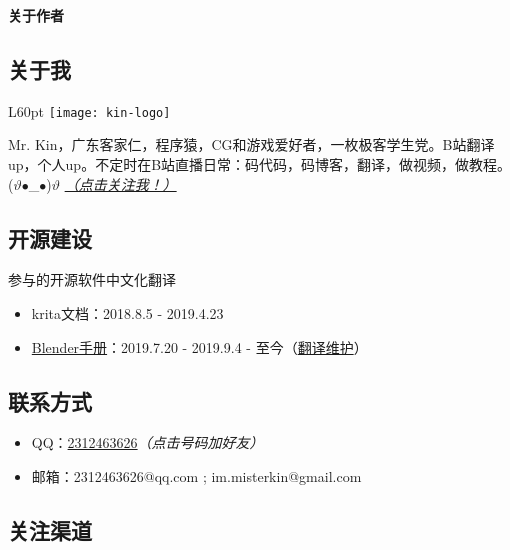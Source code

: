 \begin{center}
    {\bfseries\sffamily\Large 关于作者}
\end{center}

\subsection*{\bfseries \sffamily 关于我}
\begin{wrapfigure}[3]{L}{60pt}
    \vspace*{-20pt}
    \centering
    \texttt{[image: kin-logo]}
\end{wrapfigure}
Mr. Kin，广东客家仁，程序猿，CG和游戏爱好者，一枚极客学生党。B站翻译up，个人up。不定时在B站直播日常：码代码，码博客，翻译，做视频，做教程。 ($\vartheta$$\bullet$\_$\bullet$)$\vartheta$ \hyperlink{follow}{\emph{（点击关注我！）}}

\subsection*{\bfseries \sffamily 开源建设}

\noindent 参与的开源软件中文化翻译

\begin{itemize}
    \item krita文档：2018.8.5 - 2019.4.23
    \item \href{https://www.blendercn.org/5812.html?tdsourcetag=s_pctim_aiomsg}{Blender手册}：2019.7.20 - 2019.9.4 - 至今（\href{https://developer.blender.org/p/Mr_Kin/}{翻译维护}）
\end{itemize}

\subsection*{\bfseries \sffamily \hypertarget{contact}{联系方式}}
\vspace*{-1ex}

\begin{itemize}
    \item QQ：\href{tencent://AddContact/?fromId=45&fromSubId=1&subcmd=all&uin=2312463626&website=www.oicqzone.com}{2312463626}\emph{\color{red}（点击号码加好友）}
    \item 邮箱：2312463626@qq.com ; im.misterkin@gmail.com
\end{itemize}

\subsection*{\bfseries \sffamily \hypertarget{follow}{关注渠道}}
\vspace*{-1ex}
\vspace*{-2ex}

